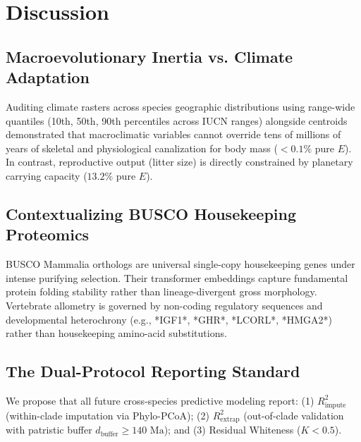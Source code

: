 \documentclass[sigconf,nonacm]{acmart}
\begin{document}
\section{Discussion}

\subsection{Macroevolutionary Inertia vs. Climate Adaptation}
Auditing climate rasters across species geographic distributions using range-wide quantiles (10th, 50th, 90th percentiles across IUCN ranges) alongside centroids demonstrated that macroclimatic variables cannot override tens of millions of years of skeletal and physiological canalization for body mass ($<0.1\%$ pure $E$). In contrast, reproductive output (litter size) is directly constrained by planetary carrying capacity ($13.2\%$ pure $E$).

\subsection{Contextualizing BUSCO Housekeeping Proteomics}
BUSCO Mammalia orthologs are universal single-copy housekeeping genes under intense purifying selection. Their transformer embeddings capture fundamental protein folding stability rather than lineage-divergent gross morphology. Vertebrate allometry is governed by non-coding regulatory sequences and developmental heterochrony (e.g., *IGF1*, *GHR*, *LCORL*, *HMGA2*) rather than housekeeping amino-acid substitutions.

\subsection{The Dual-Protocol Reporting Standard}
We propose that all future cross-species predictive modeling report: (1) $R^2_{\text{impute}}$ (within-clade imputation via Phylo-PCoA); (2) $R^2_{\text{extrap}}$ (out-of-clade validation with patristic buffer $d_{\text{buffer}} \ge 140\text{ Ma}$); and (3) Residual Whiteness ($K < 0.5$).
\end{document}
